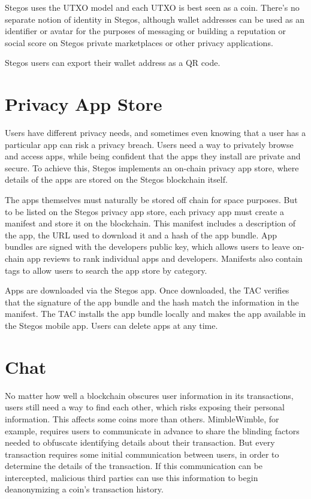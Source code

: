\documentclass[8pt,fleqn,openany]{book}
\begin{document}
Stegos uses the UTXO model and each UTXO is best seen as a coin. There’s no separate notion of identity in Stegos, although wallet addresses can be used as an identifier or avatar for the purposes of messaging or building a reputation or social score on Stegos private marketplaces or other privacy applications. 

Stegos users can export their wallet address as a QR code.
	
\section{Privacy App Store}
Users have different privacy needs, and sometimes even knowing that a user has a particular app can risk a privacy breach. Users need a way to privately browse and access apps, while being confident that the apps they install are private and secure. To achieve this, Stegos implements an on-chain privacy app store, where details of the apps are stored on the Stegos blockchain itself.

The apps themselves must naturally be stored off chain for space purposes. But to be listed on the Stegos privacy app store, each privacy app must create a manifest and store it on the blockchain. This manifest includes a description of the app, the URL used to download it and a hash of the app bundle. App bundles are signed with the developers public key, which allows users to leave on-chain app reviews to rank individual apps and developers. Manifests also contain tags to allow users to search the app store by category.

Apps are downloaded via the Stegos app. Once downloaded, the TAC verifies that the signature of the app bundle and the hash match the information in the manifest. The TAC installs the app bundle locally and makes the app available in the Stegos mobile app. Users can delete apps at any time.

\section{Chat}\label{sec:chat}
No matter how well a blockchain obscures user information in its transactions, users still need a way to find each other, which risks exposing their personal information. This affects some coins more than others. MimbleWimble, for example, requires users to communicate in advance to share the blinding factors needed to obfuscate identifying details about their transaction. But every transaction requires some initial communication between users, in order to determine the details of the transaction. If this communication can be intercepted, malicious third parties can use this information to begin deanonymizing a coin’s transaction history. 
\end{document}
